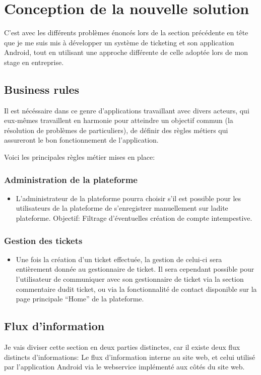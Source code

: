 \documentclass[12pt,table,a4paper]{report}
\begin{document}
\section{Conception de la nouvelle solution}
C'est avec les différents problèmes énoncés lors de la section précédente en tête que je me suis mis à développer un système de ticketing et son application Android, tout en utilisant une approche différente de celle adoptée lors de mon stage en entreprise.

\subsection{Business rules}
Il est nécéssaire dans ce genre d'applications travaillant avec divers acteurs, qui eux-mêmes travaillent en harmonie pour atteindre un objectif commun (la résolution de problèmes de particuliers), de définir des règles métiers qui assureront le bon fonctionnement de l'application.

Voici les principales règles métier mises en place:

\subsubsection{Administration de la plateforme}
\begin{itemize}
	\item{L'administrateur de la plateforme pourra choisir s'il est possible pour les utilisateurs de la plateforme de s'enregistrer manuellement sur ladite plateforme. Objectif: Filtrage d'éventuelles création de compte intempestive.}
\end{itemize}

\subsubsection{Gestion des tickets}
\begin{itemize}
	\item{Une fois la création d'un ticket effectuée, la gestion de celui-ci sera entièrement donnée au gestionnaire de ticket. Il sera cependant possible pour l'utilisateur de communiquer avec son gestionnaire de ticket via la section commentaire dudit ticket, ou via la fonctionnalité de contact disponible sur la page principale "`Home"' de la plateforme.}
\end{itemize}

\subsection{Flux d'information}
Je vais diviser cette section en deux parties distinctes, car il existe deux flux distincts d'informations: Le flux d'information interne au site web, et celui utilisé par l'application Android via le webservice implémenté aux côtés du site web.
\end{document}

